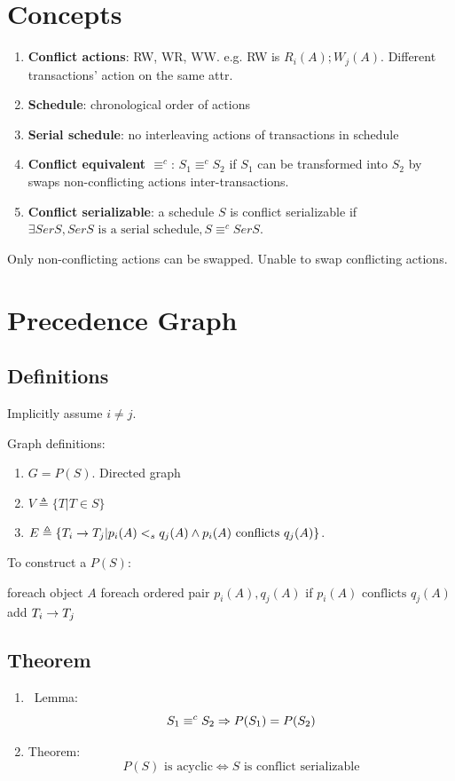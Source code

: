 \documentclass[a4paper]{report}
\begin{document}
\section{Concepts}
\begin{enumerate}
\item \textbf{Conflict actions}: RW, WR, WW. e.g. RW is $R_i(A); W_j(A)$. Different transactions' action on the same attr. 
\item \textbf{Schedule}: chronological order of actions 
\item \textbf{Serial schedule}: no interleaving actions of transactions in schedule
\item \textbf{Conflict equivalent $\equiv^c$}: $S_1 \equiv^c S_2$ if $S_1$ can be transformed into $S_2$ by swaps non-conflicting actions inter-transactions.
\item \textbf{Conflict serializable}: a schedule $S$ is conflict serializable if $\exists SerS, SerS\text{ is a serial schedule}, S\equiv^c SerS$.
\end{enumerate}

Only non-conflicting actions can be swapped. Unable to swap conflicting actions.


\section{Precedence Graph}
\subsection{Definitions}
Implicitly assume $i\neq j$.

Graph definitions: 
\begin{enumerate}
\item $G = P(S)$. Directed graph 
\item $V \triangleq \{T|T\in S\}$
\item $E \triangleq \{T_i \rightarrow T_j| p_i(A) <_s q_j(A) \wedge p_i(A)  \text{ conflicts } q_j(A)\}$. 
\end{enumerate}
To construct a $P(S)$:
\begin{pseudo}
foreach object $A$
  foreach ordered pair $p_i(A), q_j(A)$
    if $p_i(A) \text{ conflicts } q_j(A)$
      add $T_i \rightarrow T_j$
\end{pseudo}
\subsection{Theorem}
\begin{enumerate}
\item\ Lemma: 
$$S_1 \equiv^c S_2 \Rightarrow P(S_1)=P(S_2)$$
\item Theorem:
$$P(S) \text{ is acyclic} \Leftrightarrow S \text{ is conflict serializable}$$
\end{enumerate}
\end{document}
